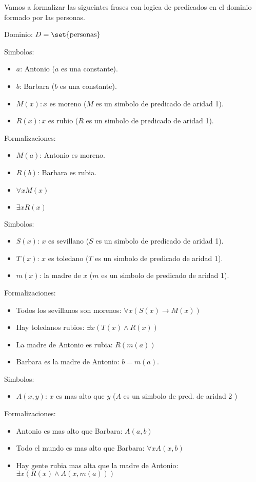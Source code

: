 \begin{example}
	Vamos a formalizar las sigueintes frases con logica de predicados en el dominio formado por las personas.

	Dominio: \(D = \set{\text{personas} }\)

	Simbolos:
	\begin{itemize}
		\item \(a \): Antonio (\(a \) es una constante).
		\item \(b\): Barbara (\(b \) es una constante).
		\item \(M(x): x \) es moreno (\(M \) es un simbolo de predicado de aridad 1).
		\item \(R(x): x \) es rubio (\(R \) es un simbolo de predicado de aridad 1).
	\end{itemize}

	Formalizaciones:
	\begin{itemize}
		\item \(M(a )\): Antonio es moreno.
		\item \(R(b )\): Barbara es rubia.
		\item \(\forall x M(x )\)
		\item \(\exists x R(x )\)
	\end{itemize}

	Simbolos:
	\begin{itemize}
		\item \(S(x )\): \(x \) es sevillano (\(S \) es un simbolo de predicado de aridad 1).
		\item \(T(x )\): \(x \) es toledano (\(T \) es un simbolo de predicado de aridad 1).
		\item \(m(x )\): la madre de \(x \)  (\(m \) es un simbolo de predicado de aridad 1).
	\end{itemize}

	Formalizaciones:
	\begin{itemize}
		\item Todos los sevillanos son morenos: \(\forall x (S(x) \to M(x ))\)
		\item Hay toledanos rubios: \(\exists x (T(x) \wedge R(x ))\)
		\item La madre de Antonio es rubia: \(R(m(a ))\)
		\item Barbara es la madre de Antonio: \(b = m(a )\).
	\end{itemize}

	Simbolos:
	\begin{itemize}
		\item \(A(x,y)\): \(x \) es mas alto que \(y \) (\(A \) es un simbolo de pred. de aridad 2 )
	\end{itemize}
	Formalizaciones:
	\begin{itemize}
		\item Antonio es mas alto que Barbara: \(A(a,b )\)
		\item Todo el mundo es mas alto que Barbara: \(\forall x A(x,b )\)
		\item Hay gente rubia mas alta que la madre de Antonio: \(\exists x (R(x) \wedge A(x,m(a )))\)
	\end{itemize}
\end{example}

